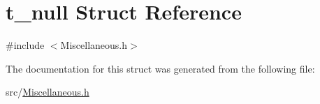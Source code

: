 \hypertarget{structt__null}{}\section{t\+\_\+null Struct Reference}
\label{structt__null}


{\ttfamily \#include $<$Miscellaneous.\+h$>$}



The documentation for this struct was generated from the following file\+:\begin{DoxyCompactItemize}
\item 
src/\hyperlink{_miscellaneous_8h}{Miscellaneous.\+h}\end{DoxyCompactItemize}
